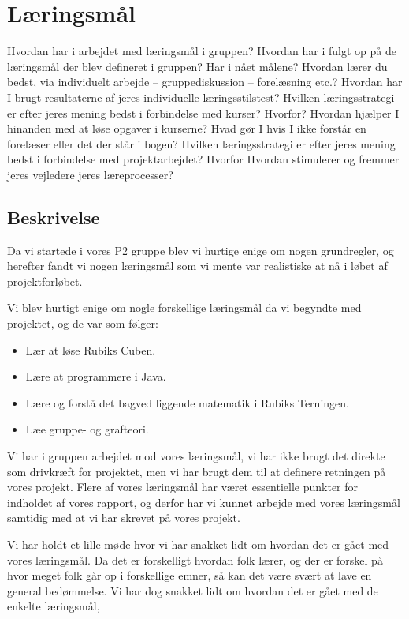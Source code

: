 \section{L\ae{}ringsm\aa{}l}

Hvordan har i arbejdet med l\ae{}ringsm\aa{}l i gruppen?
Hvordan har i fulgt op p\aa{} de l\ae{}ringsm\aa{}l der blev defineret i gruppen? Har i n\aa{}et m\aa{}lene?
Hvordan l\ae{}rer du bedst, via individuelt arbejde – gruppediskussion – forel\ae{}sning etc.?
Hvordan har I brugt resultaterne af jeres individuelle l\ae{}ringsstilstest?
Hvilken l\ae{}ringsstrategi er efter jeres mening bedst i forbindelse med kurser? Hvorfor?
Hvordan hj\ae{}lper I hinanden med at l\o{}se opgaver i kurserne?
Hvad g\o{}r I hvis I ikke forst\aa{}r en forel\ae{}ser eller det der st\aa{}r i bogen?
Hvilken l\ae{}ringsstrategi er efter jeres mening bedst i forbindelse med projektarbejdet? Hvorfor
Hvordan stimulerer og fremmer jeres vejledere jeres l\ae{}reprocesser?


\subsection{Beskrivelse}
Da vi startede i vores P2 gruppe blev vi hurtige enige om nogen grundregler, og herefter fandt vi nogen l\ae{}ringsm\aa{}l som vi mente var realistiske at n\aa{} i l\o{}bet af projektforl\o{}bet.

Vi blev hurtigt enige om nogle forskellige l\ae{}ringsm\aa{}l da vi begyndte med projektet, og de var som f\o{}lger:

\begin{itemize}
\item L\ae{}r at l\o{}se Rubiks Cuben.
\item L\ae{}re at programmere i Java.
\item L\ae{}re  og forst\aa{} det bagved liggende matematik i Rubiks Terningen. 
\item L\ae{}e gruppe- og grafteori.
\end{itemize}

Vi har i gruppen arbejdet mod vores l\ae{}ringsm\aa{}l, vi har ikke brugt det direkte som drivkr\ae{}ft for projektet, men vi har brugt dem til at definere retningen p\aa{} vores projekt.
Flere af vores l\ae{}ringsm\aa{}l har v\ae{}ret essentielle punkter for indholdet af vores rapport, og derfor har vi kunnet arbejde med vores l\ae{}ringsm\aa{}l samtidig med at vi har skrevet p\aa{} vores projekt.

Vi har holdt et lille m\o{}de hvor vi har snakket lidt om hvordan det er g\aa{}et med vores l\ae{}ringsm\aa{}l. Da det er forskelligt hvordan folk l\ae{}rer, og der er forskel p\aa{} hvor meget folk g\aa{}r op i forskellige emner, s\aa{} kan det v\ae{}re sv\ae{}rt at lave en general bed\o{}mmelse. Vi har dog snakket lidt om hvordan det er g\aa{}et med de enkelte l\ae{}ringsm\aa{}l,

